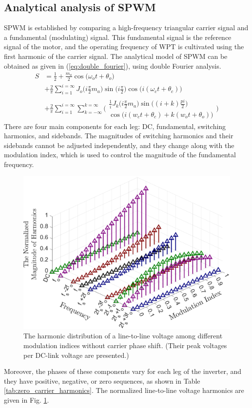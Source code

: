 \documentclass[journal]{IEEEtran}
\begin{document}
\subsection{Analytical analysis of  SPWM}
SPWM is established by comparing a high-frequency triangular carrier signal and a fundamental (modulating) signal. 
This fundamental signal is the reference signal of the motor, and the operating frequency of WPT is cultivated using the first harmonic of the carrier signal.
The analytical model of SPWM can be obtained as given in (\ref{eq:double_fourier}), using double Fourier analysis.
\begin{equation}
\label{eq:double_fourier}
 \begin{split}
S&= \frac{1}{2}+ \frac{m_a}{2}\cos{\Big( \omega_ot+\theta_o\Big)}  \\
&+\frac{2}{\pi}\sum_{i=1}^{i=\infty}J_o\Big( i\frac{\pi}{2}m_a\Big)\sin{\Big(i\frac{\pi}{2}\Big)}\cos{ \Big( i(\omega_ct+\theta_c) \Big)}  \\
&+ \frac{2}{\pi}\sum_{i=1}^{i=\infty}\sum_{k=-\infty}^{k=\infty} 
  \Bigg(  \begin{array}{cc}
 \frac{1}{i} J_k\Big(i\frac{\pi}{2}m_a\Big)  \sin\Big((i+k)\frac{pi}{2}\Big)  \\
     \cos{\Big( i(w_ct+\theta_c) +k(w_ot+\theta_o) \Big)}
\end{array}\Bigg)
\end{split}
\end{equation}
There are four main components for each leg: DC, fundamental, switching harmonics, and sidebands.
The magnitudes of switching harmonics and their sidebands cannot be adjusted independently, and they change along with the modulation index, which is used to control the magnitude of the fundamental frequency.
\begin{figure}[h]
\centering
     \includegraphics[width=0.8\linewidth]{harmonic_dist_VAB.eps}
  \caption{ The harmonic distribution of a line-to-line voltage among different modulation indices without carrier phase shift. (Their peak voltages per DC-link voltage are presented.)}
    \label{fig:harmonic_dist_VAB}
\end{figure}
Moreover, the phases of these components vary for each leg of the inverter, and they have positive, negative, or zero sequences, as shown in Table \ref{tab:zero_carrier_harmonics}.
The normalized line-to-line voltage harmonics are given in Fig. \ref{fig:harmonic_dist_VAB}.
\end{document}
